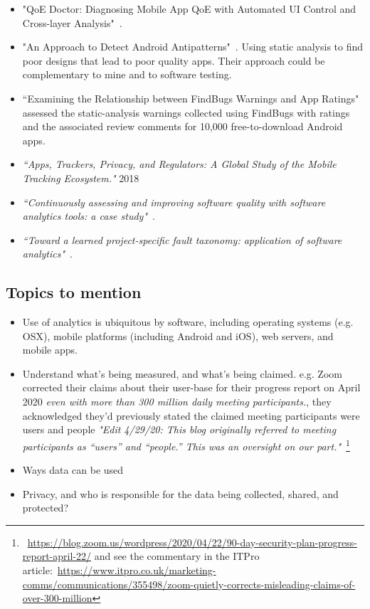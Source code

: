 \begin{itemize}
    \item "QoE Doctor: Diagnosing Mobile App QoE with Automated UI Control and Cross-layer Analysis"~\cite{chen2014qoe}.
    \item "An Approach to Detect Android Antipatterns"~\cite{hecht2015approach}. Using static analysis to find poor designs that lead to poor quality apps. Their approach could be complementary to mine and to software testing.
    \item ``Examining the Relationship between FindBugs Warnings and App Ratings"~\cite{khalid2016_examining_the_relationship_between_findbugs_warnings_and_app_ratings} assessed the static-analysis warnings collected using FindBugs with ratings and the associated review comments for 10,000 free-to-download Android apps.
    
    \item \emph{``Apps, Trackers, Privacy, and Regulators: A Global Study of the Mobile Tracking Ecosystem."} 2018
    
    \item \emph{``Continuously assessing and improving software quality with software analytics tools: a case study"}~\cite{martinez_fernandez2019_continuously_assessing_and_improving_software_quallty_with_software_analytics_tools}.
    
    \item \emph{``Toward a learned project-specific fault taxonomy: application of software analytics"}~\cite{kidwell2015_toward_fault_taxonomy_application_of_software_analytics}.
    
\end{itemize}

\subsection{Topics to mention}
\begin{itemize}
    \item Use of analytics is ubiquitous by software, including operating systems (e.g. OSX), mobile platforms (including Android and iOS), web servers, and mobile apps. 
    \item Understand what's being measured, and what's being claimed. e.g. Zoom corrected their claims about their user-base for their progress report on  April 2020 \emph{even with more than 300 million daily meeting participants.}, they acknowledged they'd previously stated the claimed meeting participants were users and people \emph{"Edit 4/29/20: This blog originally referred to meeting participants as “users” and “people.” This was an oversight on our part."}~\footnote{~\url{https://blog.zoom.us/wordpress/2020/04/22/90-day-security-plan-progress-report-april-22/} and see the commentary in the ITPro article:~\url{https://www.itpro.co.uk/marketing-comms/communications/355498/zoom-quietly-corrects-misleading-claims-of-over-300-million}}
    \item Ways data can be used
    \item Privacy, and who is responsible for the data being collected, shared, and protected?
\end{itemize}

